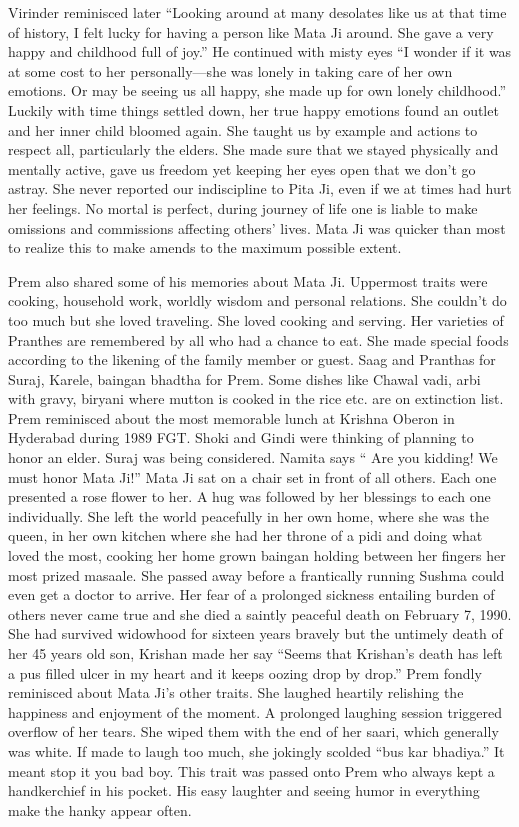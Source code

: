 Virinder reminisced later “Looking around at many desolates like us at that time of history, I felt lucky for having a person like Mata Ji around. She gave a very happy and childhood full of joy.” He continued with misty eyes “I wonder if it was at some cost to her personally—she was lonely in taking care of her own emotions. Or may be seeing us all happy, she made up for own lonely childhood.” 
Luckily with time things settled down, her true happy emotions found an outlet and her inner child bloomed again. She taught us by example and actions to respect all, particularly the elders. She made sure that we stayed physically and mentally active, gave us freedom yet keeping her eyes open that we don’t go astray. She never reported our indiscipline to Pita Ji, even if we at times had hurt her feelings. No mortal is perfect, during journey of life one is liable to make omissions and commissions affecting others’ lives. Mata Ji was quicker than most to realize this to make amends to the maximum possible extent. 

Prem also shared some of his memories about Mata Ji. Uppermost traits were cooking, household work, worldly wisdom and personal relations. She couldn’t do too much but she loved traveling. 
She loved cooking and serving. Her varieties of Pranthes are remembered by all who had a chance to eat. She made special foods according to the likening of the family member or guest. Saag and Pranthas for Suraj, Karele, baingan bhadtha for Prem. Some dishes like Chawal vadi, arbi with gravy, biryani where mutton is cooked in the rice etc. are on extinction list. 
Prem reminisced about the most memorable lunch at Krishna Oberon in Hyderabad during 1989 FGT. Shoki and Gindi were thinking of planning to honor an elder. Suraj was being considered. Namita says “ Are you kidding! We must honor Mata Ji!” Mata Ji sat on a chair set in front of all others. Each one presented a rose flower to her. A hug was followed by her blessings to each one individually. She left the world peacefully in her own home, where she was the queen, in her own kitchen where she had her throne of a pidi and doing what loved the most, cooking her home grown baingan holding between her fingers her most prized masaale. She passed away before a frantically running Sushma could even get a doctor to arrive. Her fear of a prolonged sickness entailing burden of others never came true and she died a saintly peaceful death on February 7, 1990. She had survived widowhood for sixteen years bravely but the untimely death of her 45 years old son, Krishan made her say “Seems that Krishan’s death has left a pus filled ulcer in my heart and it keeps oozing drop by drop.” 
Prem fondly reminisced about Mata Ji’s other traits. She laughed heartily relishing the happiness and enjoyment of the moment. A prolonged laughing session triggered overflow of her tears. She wiped them with the end of her saari, which generally was white. If made to laugh too much, she jokingly scolded “bus kar bhadiya.” It meant stop it you bad boy. This trait was passed onto Prem who always kept a handkerchief in his pocket. His easy laughter and seeing humor in everything make the hanky appear often. 

